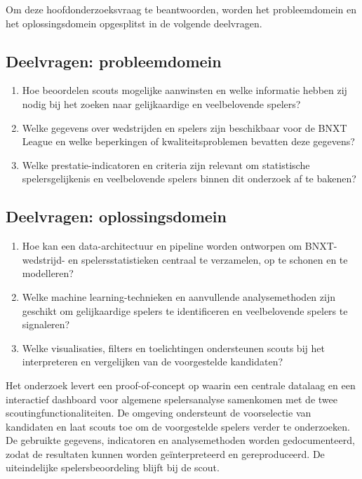 Om deze hoofdonderzoeksvraag te beantwoorden, worden het probleemdomein en het oplossingsdomein opgesplitst in de volgende deelvragen.

\subsection{Deelvragen: probleemdomein}

\begin{enumerate}
  \item Hoe beoordelen scouts mogelijke aanwinsten en welke informatie hebben zij nodig bij het zoeken naar gelijkaardige en veelbelovende spelers?
  \item Welke gegevens over wedstrijden en spelers zijn beschikbaar voor de BNXT League en welke beperkingen of kwaliteitsproblemen bevatten deze gegevens?
  \item Welke prestatie-indicatoren en criteria zijn relevant om statistische spelersgelijkenis en veelbelovende spelers binnen dit onderzoek af te bakenen?
\end{enumerate}

\subsection{Deelvragen: oplossingsdomein}

\begin{enumerate}
  \item Hoe kan een data-architectuur en pipeline worden ontworpen om BNXT-wedstrijd- en spelersstatistieken centraal te verzamelen, op te schonen en te modelleren?
  \item Welke machine learning-technieken en aanvullende analysemethoden zijn geschikt om gelijkaardige spelers te identificeren en veelbelovende spelers te signaleren?
  \item Welke visualisaties, filters en toelichtingen ondersteunen scouts bij het interpreteren en vergelijken van de voorgestelde kandidaten?
\end{enumerate}

Het onderzoek levert een proof-of-concept op waarin een centrale datalaag en een interactief dashboard voor algemene spelersanalyse samenkomen met de twee scoutingfunctionaliteiten. De omgeving ondersteunt de voorselectie van kandidaten en laat scouts toe om de voorgestelde spelers verder te onderzoeken. De gebruikte gegevens, indicatoren en analysemethoden worden gedocumenteerd, zodat de resultaten kunnen worden geïnterpreteerd en gereproduceerd. De uiteindelijke spelersbeoordeling blijft bij de scout.

